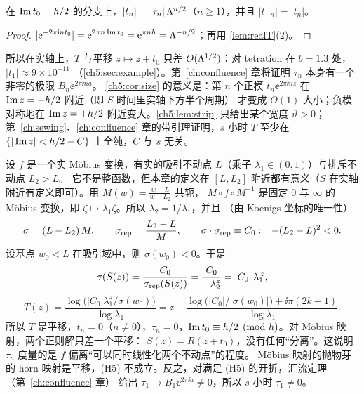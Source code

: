 \begin{corollary}[转移系数的大小]\label{ch5:cor:size}
在 $\operatorname{Im} t_0=h/2$ 的分支上，$|t_n|=|\tau_n|\,\Lambda^{n/2}$（$n\ge1$），并且 $|t_{-n}|=|t_n|$。
\end{corollary}

\begin{proof}
$|\mathrm{e}^{-2\pi\mathrm{i} nt_0}|=\mathrm{e}^{2\pi n\operatorname{Im} t_0}=\mathrm{e}^{\pi nh}=\Lambda^{-n/2}$；再用 \cref{lem:realT}(2)。
\end{proof}

所以在实轴上，$T$ 与平移 $z\mapsto z+t_0$ 只差 $O(\Lambda^{1/2})$：对 tetration 在 $b=1.3$ 处，$|t_1|\approx9\times10^{-11}$
（\cref{ch5:sec:example}）。第~\ref{ch:confluence} 章将证明 $\tau_n$ 本身有一个非零的极限 $B_n\ee^{2\pi\ii na}$。
\cref{ch5:cor:size} 的意义是：第 $n$ 个正模 $t_n\ee^{2\pi\ii nz}$ 在 $\operatorname{Im} z=-h/2$ 附近（即 $S$ 时间里实轴下方半个周期）
才变成 $O(1)$ 大小；负模对称地在 $\operatorname{Im} z=+h/2$ 附近变大。\cref{ch5:lem:strip} 只给出某个宽度 $\vartheta>0$；
第~\ref{ch:sewing}、\ref{ch:confluence} 章的带引理证明，$s$ 小时 $T$ 至少在 $\{|\operatorname{Im} z|<h/2-C\}$ 上全纯，$C$ 与 $s$ 无关。

\begin{example}\label{ch5:exa:mobius}
设 $f$ 是一个实 Möbius 变换，有实的吸引不动点 $L$（乘子 $\lambda_1\in(0,1)$）与排斥不动点 $L_2>L$。
它不是整函数，但本章的定义在 $[L,L_2]$ 附近都有意义（$S$ 在实轴附近有定义即可）。用 $M(w)=\frac{w-L}{w-L_2}$ 共轭，
$M\circ f\circ M^{-1}$ 是固定 $0$ 与 $\infty$ 的 Möbius 变换，即 $\zeta\mapsto\lambda_1\zeta$。所以 $\lambda_2=1/\lambda_1$，并且
（由 Koenigs 坐标的唯一性）
\[
 \sigma=(L-L_2)\,M,\qquad \sigma_{\rm rep}=\frac{L_2-L}{M},\qquad \sigma\cdot\sigma_{\rm rep}\equiv C_0:=-(L_2-L)^2<0 .
\]
设基点 $w_0<L$ 在吸引域中，则 $\sigma(w_0)<0$。于是
\[
 \sigma(S(z))=\frac{C_0}{\sigma_{\rm rep}(S(z))}=\frac{C_0}{-\lambda_2^z}=|C_0|\,\lambda_1^{\,z},
\]
\[
 T(z)=\frac{\log\bigl(|C_0|\lambda_1^z/\sigma(w_0)\bigr)}{\log\lambda_1}=z+\frac{\log\bigl(|C_0|/|\sigma(w_0)|\bigr)+\ii\pi(2k+1)}{\log\lambda_1}.
\]
所以 $T$ 是平移，$t_n=0$（$n\ne0$），$\tau_n=0$，$\operatorname{Im} t_0\equiv h/2\pmod h$。对 Möbius 映射，两个正则解只差一个平移：
$S(z)=R(z+t_0)$，没有任何``分离''。这说明 $\tau_n$ 度量的是 $f$ 偏离``可以同时线性化两个不动点''的程度。
Möbius 映射的抛物芽的 horn 映射是平移，(H5) 不成立。反之，对满足 (H5) 的开折，汇流定理（第~\ref{ch:confluence} 章）
给出 $\tau_1\to B_1\ee^{2\pi\ii a}\ne0$，所以 $s$ 小时 $\tau_1\ne0$。
\end{example}

